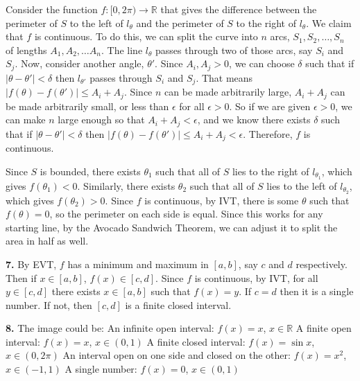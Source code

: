 \documentclass{article}
\begin{document}
Consider the function $f: [0, 2\pi) \to \mathbb{R}$ that gives the difference between the perimeter of $S$ to the left of $l_\theta$ and the perimeter of $S$ to the right of $l_\theta$. We claim that $f$ is continuous. To do this, we can split the curve into $n$ arcs, $S_1, S_2, \ldots, S_n$ of lengths $A_1, A_2, \ldots A_n$. The line $l_\theta$ passes through two of those arcs, say $S_i$ and $S_j$. Now, consider another angle, $\theta'$. Since $A_i, A_j > 0$, we can choose $\delta$ such that if $|\theta - \theta'| < \delta$ then $l_{\theta'}$ passes through $S_i$ and $S_j$. That means $|f(\theta) - f(\theta')| \le A_i + A_j$. Since $n$ can be made arbitrarily large, $A_i + A_j$ can be made arbitrarily small, or less than $\epsilon$ for all $\epsilon > 0$. So if we are given $\epsilon > 0$, we can make $n$ large enough so that $A_i + A_j < \epsilon$, and we know there exists $\delta$ such that if $|\theta - \theta'| < \delta$ then $|f(\theta) - f(\theta')| \le A_i + A_j < \epsilon$. Therefore, $f$ is continuous.
\newline

Since $S$ is bounded, there exists $\theta_1$ such that all of $S$ lies to the right of $l_{\theta_1}$, which gives $f(\theta_1) < 0$. Similarly, there exists $\theta_2$ such that all of $S$ lies to the left of $l_{\theta_2}$, which gives $f(\theta_2) > 0$. Since $f$ is continuous, by IVT, there is some $\theta$ such that $f(\theta) = 0$, so the perimeter on each side is equal. Since this works for any starting line, by the Avocado Sandwich Theorem, we can adjust it to split the area in half as well.
\newline

\textbf{7.} By EVT, $f$ has a minimum and maximum in $[a, b]$, say $c$ and $d$ respectively. Then if $x \in [a, b]$, $f(x) \in [c, d]$. Since $f$ is continuous, by IVT, for all $y \in [c, d]$ there exists $x \in [a, b]$ such that $f(x) = y$. If $c = d$ then it is a single number. If not, then $[c, d]$ is a finite closed interval.
\newline

\textbf{8.} The image could be: \newline
An infinite open interval: $f(x) = x$, $x \in \mathbb{R}$ \newline
A finite open interval: $f(x) = x$, $x \in (0, 1)$ \newline
A finite closed interval: $f(x) = \sin x$, $x \in (0, 2\pi)$ \newline
An interval open on one side and closed on the other: $f(x) = x^2$, $x \in (-1, 1)$ \newline
A single number: $f(x) = 0$, $x \in (0, 1)$
\end{document}
